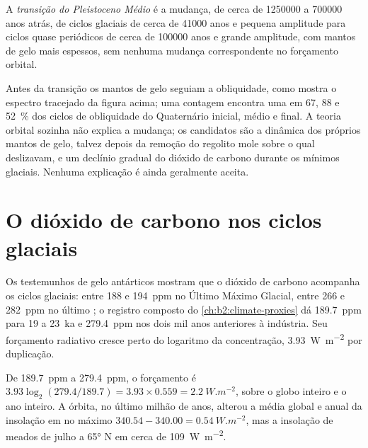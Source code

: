 \begin{definition}\label{def:b2:orbital-forcing:mpt}
A \emph{transição do Pleistoceno Médio} é a mudança, de cerca de
\num{1250000} a \num{700000} anos atrás, de ciclos glaciais de cerca de \num{41000} anos e pequena
amplitude para ciclos quase periódicos de cerca de \num{100000} anos e grande amplitude, com mantos de gelo
mais espessos, sem nenhuma mudança correspondente no forçamento orbital.
\end{definition}

Antes da transição os mantos de gelo seguiam a obliquidade, como mostra o espectro tracejado da figura
acima; uma contagem encontra uma  em 67, 88 e \qty{52}{\percent} dos
ciclos de obliquidade do Quaternário inicial, médio e final. A teoria orbital sozinha não explica a mudança; os candidatos são a dinâmica
dos próprios mantos de gelo, talvez depois da remoção do regolito mole sobre o qual deslizavam,
e um declínio gradual do dióxido de carbono durante os mínimos glaciais. Nenhuma explicação é ainda
geralmente aceita.

\section{O dióxido de carbono nos ciclos glaciais}\label{sec:b2:orbital-forcing:co2}

Os testemunhos de gelo antárticos mostram que o dióxido de carbono acompanha os ciclos glaciais: entre 188 e
\qty{194}{ppm} no Último Máximo Glacial, entre 266 e \qty{282}{ppm} no último ;
o registro composto do \cref{ch:b2:climate-proxies} dá \qty{189.7}{ppm} para 19 a
\qty{23}{ka} e \qty{279.4}{ppm} nos dois mil anos anteriores à indústria. Seu forçamento radiativo
cresce perto do logaritmo da concentração, \qty{3.93}{W.m^{-2}} por duplicação.

\begin{example}\label{ex:b2:orbital-forcing:co2}
De \qty{189.7}{ppm} a \qty{279.4}{ppm}, o forçamento é $3.93\log_2(279.4/189.7) = 3.93 \times
0.559 = \qty{2.2}{W.m^{-2}}$, sobre o globo inteiro e o ano inteiro. A órbita, no último
milhão de anos, alterou a média global e anual da insolação em no máximo $340.54 - 340.00 =
\qty{0.54}{W.m^{-2}}$, mas a insolação de meados de julho a \ang{65} N em cerca de \qty{109}{W.m^{-2}}.
\end{example}

